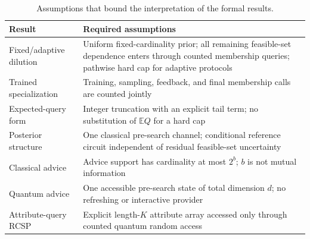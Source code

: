 
\begin{table}[ht]
\centering
\caption{Assumptions that bound the interpretation of the formal results.}
\label{tab:proof-assumptions}
\small
\begin{tabularx}{\textwidth}{@{}lX@{}}
\toprule
Result & Required assumptions \\
\midrule
Fixed/adaptive dilution & Uniform fixed-cardinality prior; all remaining feasible-set dependence enters through counted membership queries; pathwise hard cap for adaptive protocols \\
Trained specialization & Training, sampling, feedback, and final membership calls are counted jointly \\
Expected-query form & Integer truncation with an explicit tail term; no substitution of $\mathbb{E}Q$ for a hard cap \\
Posterior structure & One classical pre-search channel; conditional reference circuit independent of residual feasible-set uncertainty \\
Classical advice & Advice support has cardinality at most $2^b$; $b$ is not mutual information \\
Quantum advice & One accessible pre-search state of total dimension $d$; no refreshing or interactive provider \\
Attribute-query RCSP & Explicit length-$K$ attribute array accessed only through counted quantum random access \\
\bottomrule
\end{tabularx}
\end{table}
